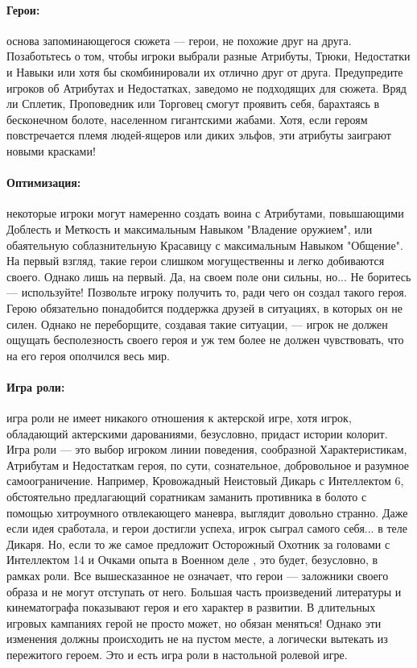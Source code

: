 \paragraph{Герои:} основа запоминающегося сюжета — герои, не похожие друг на друга. Позаботьтесь о том, чтобы игроки выбрали разные Атрибуты, Трюки, Недостатки и Навыки или хотя бы скомбинировали их отлично друг от друга. Предупредите игроков об Атрибутах и Недостатках, заведомо не подходящих для сюжета. Вряд ли Сплетик, Проповедник или Торговец смогут проявить себя, барахтаясь в бесконечном болоте, населенном гигантскими жабами. Хотя, если героям повстречается племя людей-ящеров или диких эльфов, эти атрибуты заиграют новыми красками!
\paragraph{Оптимизация:} некоторые игроки могут намеренно создать воина с Атрибутами, повышающими Доблесть и Меткость и максимальным Навыком "Владение оружием", или обаятельную соблазнительную Красавицу с максимальным Навыком "Общение". На первый взгляд, такие герои слишком могущественны и легко добиваются своего. Однако лишь на первый. Да, на своем поле они сильны, но... Не боритесь — используйте! Позвольте игроку получить то, ради чего он создал такого героя. Герою обязательно понадобится поддержка друзей в ситуациях, в которых он не силен. Однако не переборщите, создавая такие ситуации, — игрок не должен ощущать бесполезность своего героя и уж тем более не должен чувствовать, что на его героя ополчился весь мир.
\paragraph{Игра роли:} игра роли не имеет никакого отношения к актерской игре, хотя игрок, обладающий актерскими дарованиями, безусловно, придаст истории колорит. Игра роли — это выбор игроком линии поведения, сообразной Характеристикам, Атрибутам и Недостаткам героя, по сути, сознательное, добровольное и разумное самоограничение. Например, Кровожадный Неистовый Дикарь с Интеллектом 6, обстоятельно предлагающий соратникам заманить противника в болото с помощью хитроумного отвлекающего маневра, выглядит довольно странно. Даже если идея сработала, и герои достигли успеха, игрок сыграл самого себя... в теле Дикаря.
Но, если то же самое предложит Осторожный Охотник за головами с Интеллектом 14 и Очками опыта в Военном деле , это будет, безусловно, в рамках роли. Все вышесказанное не означает, что герои — заложники своего образа и не могут отступать от него. Большая часть произведений литературы и кинематографа показывают героя и его характер в развитии. В длительных игровых кампаниях герой не просто может, но обязан меняться! Однако эти изменения должны происходить не на пустом месте, а логически вытекать из пережитого героем. Это и есть игра роли в настольной ролевой игре.
